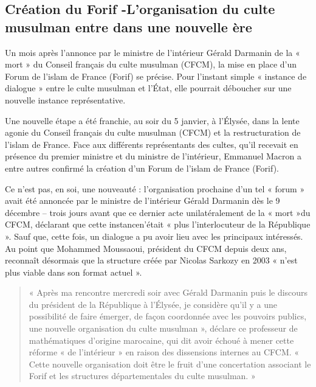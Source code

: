 \subsection*{Création du Forif -L’organisation du culte musulman entre dans une nouvelle ère }



 Un mois après l’annonce par le ministre de l’intérieur Gérald Darmanin de la « mort » du Conseil français du culte musulman (CFCM), la mise en place d’un Forum de l’islam de France (Forif) se précise. Pour l’instant simple « instance de dialogue » entre le culte musulman et l’État, elle pourrait déboucher sur une nouvelle instance représentative.


Une nouvelle étape a été franchie, au soir du 5 janvier, à l’Élysée, dans la lente agonie du Conseil français du culte musulman (CFCM) et la restructuration de l’islam de France. Face aux différents représentants des cultes, qu’il recevait en présence du premier ministre et du ministre de l’intérieur, Emmanuel Macron a entre autres confirmé la création d’un Forum de l’islam de France (Forif).



Ce n’est pas, en soi, une nouveauté : l’organisation prochaine d’un tel « forum » avait été annoncée par le ministre de l’intérieur Gérald Darmanin dès le 9 décembre – trois jours avant que ce dernier acte unilatéralement de la « mort »du CFCM, déclarant que cette instancen’était « plus l’interlocuteur de la République ». Sauf que, cette fois, un dialogue a pu avoir lieu avec les principaux intéressés. Au point que Mohammed Moussaoui, président du CFCM depuis deux ans, reconnaît désormais que la structure créée par Nicolas Sarkozy en 2003 « n’est plus viable dans son format actuel ».

\begin{quote}
    « Après ma rencontre mercredi soir avec Gérald Darmanin puis le discours du président de la République à l’Élysée, je considère qu’il y a une possibilité de faire émerger, de façon coordonnée avec les pouvoirs publics, une nouvelle organisation du culte musulman », déclare ce professeur de mathématiques d’origine marocaine, qui dit avoir échoué à mener cette réforme « de l’intérieur » en raison des dissensions internes au CFCM. « Cette nouvelle organisation doit être le fruit d’une concertation associant le Forif et les structures départementales du culte musulman. »
\end{quote}


